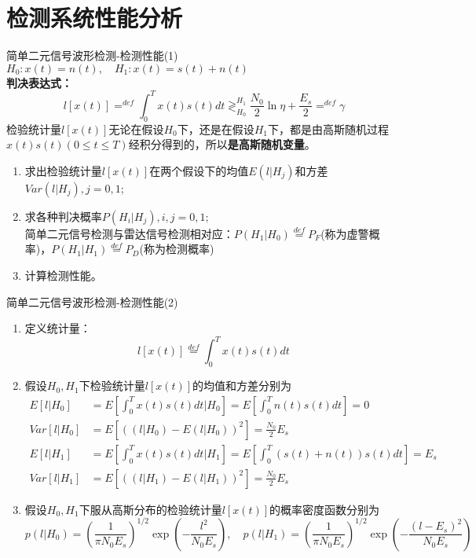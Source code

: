 \section{检测系统性能分析}

\begin{frame}{简单二元信号波形检测-检测性能(1)}
$H_0: x(t)=n(t), \quad H_1: x(t)=s(t)+n(t)$\\
\textbf{判决表达式：}
\[l[x(t)]\mathop{=}^{def}\int_{0}^{T}x(t)s(t)dt\mathop{\gtrless}_{H_0}^{H_1}\frac{N_0}{2}\ln\eta+\frac{E_s}{2}\mathop{=}^{def}\gamma \]
检验统计量$l[x(t)]$无论在假设$H_0$下，还是在假设$H_1$下，都是由高斯随机过程$x(t)s(t)(0\le t\le T)$经积分得到的，所以\textbf{是高斯随机变量}。
\begin{enumerate}
	\item 求出检验统计量$l[x(t)]$在两个假设下的均值$E(l|H_j)$和方差$Var(l|H_j),j=0,1$;
	\item 求各种判决概率$P(H_i|H_j),i,j=0,1$;\\
	简单二元信号检测与雷达信号检测相对应：$P(H_1|H_0)\mathop{=}\limits^{def}P_F$(称为虚警概率)，$P(H_1|H_1)\mathop{=}\limits^{def}P_D$(称为检测概率)
	\item 计算检测性能。
\end{enumerate}
\end{frame}

\begin{frame}[shrink]{简单二元信号波形检测-检测性能(2)}
\begin{enumerate}[1]
\item 定义统计量：
\[l[x(t)]\mathop{=}\limits^{def}\int_{0}^{T}x(t)s(t)dt \]
\item 假设$H_0,H_1$下检验统计量$l[x(t)]$的均值和方差分别为
\begin{align*}
E[l|H_0]&=E\left[\int_{0}^{T}x(t)s(t)dt|H_0\right]=E\left[\int_{0}^{T}n(t)s(t)dt\right]=0\\ 
Var[l|H_0]&=E[((l|H_0)-E(l|H_0))^2]=\frac{N_0}{2}E_s\\
E[l|H_1]&=E\left[\int_{0}^{T}x(t)s(t)dt|H_1\right]=E\left[\int_{0}^{T}(s(t)+n(t))s(t)dt\right]=E_s\\
Var[l|H_1]&=E[((l|H_1)-E(l|H_1))^2]=\frac{N_0}{2}E_s
\end{align*}
\item 假设$H_0,H_1$下服从高斯分布的检验统计量$l[x(t)]$的概率密度函数分别为\\
\[p(l|H_0)=\left(\frac{1}{\pi N_0E_s}\right)^{1/2}\exp\left(-\frac{l^2}{N_0E_s}\right),\quad p(l|H_1)=\left(\frac{1}{\pi N_0E_s}\right)^{1/2}\exp\left(-\frac{(l-E_s)^2}{N_0E_s}\right)\]
\end{enumerate}
\end{frame}

